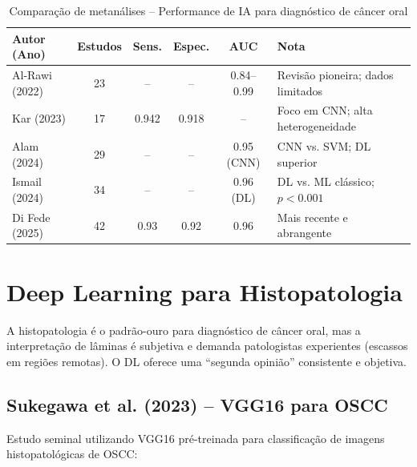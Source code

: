 \begin{table}[H]
  \centering
  \caption{Comparação de metanálises -- Performance de IA para diagnóstico de câncer oral}
  \label{tab:metanalises-cancer}
  \begin{tabularx}{\textwidth}{lccccX}
    \toprule
    \textbf{Autor (Ano)} & \textbf{Estudos} & \textbf{Sens.} & \textbf{Espec.} & \textbf{AUC} & \textbf{Nota} \\
    \midrule
    Al-Rawi (2022) & 23 & -- & -- & 0.84--0.99 & Revisão pioneira; dados limitados \\
    Kar (2023) & 17 & 0.942 & 0.918 & -- & Foco em CNN; alta heterogeneidade \\
    Alam (2024) & 29 & -- & -- & 0.95 (CNN) & CNN vs. SVM; DL superior \\
    Ismail (2024) & 34 & -- & -- & 0.96 (DL) & DL vs. ML clássico; $p < 0.001$ \\
    Di Fede (2025) & 42 & 0.93 & 0.92 & 0.96 & Mais recente e abrangente \\
    \bottomrule
  \end{tabularx}
\end{table}

\section{Deep Learning para Histopatologia}
\label{sec:histopatologia-dl}

A histopatologia é o padrão-ouro para diagnóstico de câncer oral, mas a
interpretação de lâminas é subjetiva e demanda patologistas experientes
(escassos em regiões remotas). O DL oferece uma ``segunda opinião'' consistente
e objetiva.

\subsection{Sukegawa et al. (2023) -- VGG16 para OSCC}

Estudo seminal utilizando VGG16 pré-treinada para classificação de imagens
histopatológicas de OSCC:

